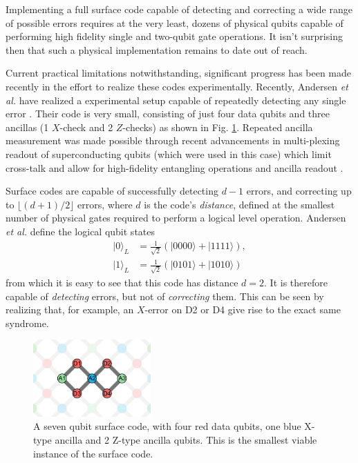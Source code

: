 Implementing a full surface code capable of detecting and correcting a wide
range of possible errors requires at the very least, dozens of physical qubits
capable of performing high fidelity single and two-qubit gate operations. It
isn't surprising then that such a physical implementation remains to date out of
reach. 

Current practical limitations notwithstanding, significant progress has been
made recently in the effort to realize these codes experimentally. Recently,
Andersen \textit{et al.} have realized a experimental setup capable of
repeatedly detecting any single error \cite{Andersen_2020}. Their code is very
small, consisting of just four data qubits and three ancillas (1 $X$-check and 2
$Z$-checks) as shown in Fig. \ref{fig:seven_qbit_code}. Repeated ancilla
measurement was made possible through recent advancements in multi-plexing
readout of superconducting qubits (which were used in this case) which limit
cross-talk and allow for high-fidelity entangling operations and ancilla readout
\cite{barends14_super_quant_circuit_at_surfac} \cite{Bultink_2020}.

Surface codes are capable of successfully detecting $d-1$ errors, and correcting
up to $\lfloor{(d+1)/2} \rfloor$ errors, where $d$ is the code's
\textit{distance}, defined at the smallest number of physical gates required to
perform a logical level operation. Andersen \textit{et al.} define the logical
qubit states
\begin{align}
|0\rangle_L &= \frac{1}{\sqrt{2}} (|0000\rangle + |1111\rangle) , \\
|1\rangle_L &= \frac{1}{\sqrt{2}} (|0101\rangle + |1010\rangle) 
\end{align}
from which it is easy to see that this code has distance $d=2$. It is therefore
capable of \textit{detecting} errors, but not of \textit{correcting} them. This
can be seen by realizing that, for example, an $X$-error on D2 or D4 give rise
to the exact same syndrome.

\begin{figure}
  \centering
  \includegraphics[width=0.4\textwidth]{images/seven_qbit_code.png}
  \caption{A seven qubit surface code, with four red data qubits, one blue
    X-type ancilla and 2 Z-type ancilla qubits. This is the smallest viable
    instance of the surface code.}
  \label{fig:seven_qbit_code}
\end{figure}

